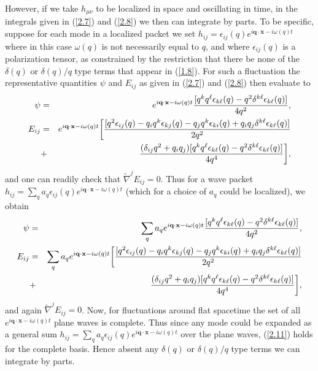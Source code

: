 However, if we take $h_{\mu\nu}$  to be localized in space and oscillating in time, in the integrals given in (\ref{2.7}) and (\ref{2.8}) we then can integrate by parts. To be specific, suppose for each mode in a localized packet we set $h_{ij}=\epsilon_{ij}(q)e^{i\mathbf{q}\cdot\mathbf{x}-i\omega(q) t}$ where in this case $\omega(q)$ is not necessarily equal to $q$, and where $\epsilon_{ij}(q)$ is a polarization tensor, as constrained by the restriction that there be none of the $\delta(q)$ or $\delta(q)/q$ type terms that appear in (\ref{1.8}). For such a fluctuation the representative quantities $\psi$ and $E_{ij}$ as given in (\ref{2.7}) and (\ref{2.8}) then evaluate to
%
\begin{eqnarray}
\psi&=&e^{i\mathbf{q}\cdot\mathbf{x}-i\omega(q) t}\frac{[q^kq^{\ell}\epsilon_{k\ell}(q)-q^2\delta^{k\ell}\epsilon_{k\ell}(q)]}{4q^2},
\nonumber\\
E_{ij}&=&e^{i\mathbf{q}\cdot\mathbf{x}-i\omega(q) t}\bigg{[}\frac{[q^2\epsilon_{ij}(q)-q_iq^k\epsilon_{kj}(q)-q_jq^k\epsilon_{ki}(q)+q_iq_j\delta^{k\ell}\epsilon_{k\ell}(q)]}{2q^2}
\nonumber\\
&+&\frac{(\delta_{ij}q^2+q_iq_j)[q^kq^{\ell}\epsilon_{k\ell}(q)-q^2\delta^{k\ell}\epsilon_{k\ell}(q)]}{4q^4}\bigg{]},
\label{2.10}
\end{eqnarray}
%
and one can readily check that $\tilde{\nabla}^jE_{ij}=0$. Thus for a wave packet  $h_{ij}=\sum_qa_q\epsilon_{ij}(q)e^{i\mathbf{q}\cdot\mathbf{x}-i\omega(q) t}$ (which for a choice of $a_q$ could be localized), we obtain 
%
\begin{eqnarray}
\psi&=&\sum_qa_qe^{i\mathbf{q}\cdot\mathbf{x}-i\omega(q) t}\frac{[q^kq^{\ell}\epsilon_{k\ell}(q)-q^2\delta^{k\ell}\epsilon_{k\ell}(q)]}{4q^2},
\nonumber\\
E_{ij}&=&\sum_qa_qe^{i\mathbf{q}\cdot\mathbf{x}-i\omega(q) t}\bigg{[}\frac{[q^2\epsilon_{ij}(q)-q_iq^k\epsilon_{kj}(q)-q_jq^k\epsilon_{ki}(q)+q_iq_j\delta^{k\ell}\epsilon_{k\ell}(q)]}{2q^2}
\nonumber\\
&+&\frac{(\delta_{ij}q^2+q_iq_j)[q^kq^{\ell}\epsilon_{k\ell}(q)-q^2\delta^{k\ell}\epsilon_{k\ell}(q)]}{4q^4}\bigg{]},
\label{2.11}
\end{eqnarray}
%
and again $\tilde{\nabla}^jE_{ij}=0$. Now, for fluctuations around flat spacetime the set of all $e^{i\mathbf{q}\cdot\mathbf{x}-i\omega (q)t}$ plane waves is complete. Thus since any mode could be expanded as a general sum $h_{ij}=\sum_qa_q\epsilon_{ij}(q)e^{i\mathbf{q}\cdot\mathbf{x}-i\omega(q) t}$ over the plane waves, (\ref{2.11}) holds for the complete basis. Hence absent any $\delta(q)$ or $\delta (q)/q$ type terms we can  integrate by parts.


